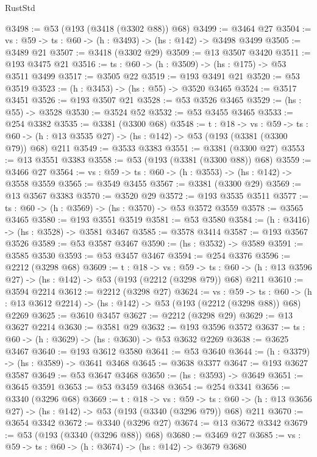 \begin{lexlean}{RustStd}
\begin{coremodule}
@3498 := @53 (@193 (@3418 (@3302 @88)) @68)
@3499 := @3464 @27
@3504 := {vs : @59} -> {ts : @60} -> (h : @3493) -> (hs : @142) -> @3498 @3499
@3505 := @3489 @21
@3507 := @3418 (@3302 @29)
@3509 := @13 @3507 @3420
@3511 := @193 @3475 @21
@3516 := {ts : @60} -> (h : @3509) -> (hs : @175) -> @53 @3511 @3499
@3517 := @3505 @22
@3519 := @193 @3491 @21
@3520 := @53 @3519
@3523 := (h : @3453) -> (hs : @55) -> @3520 @3465
@3524 := @3517 @3451
@3526 := @193 @3507 @21
@3528 := @53 @3526 @3465
@3529 := (hs : @55) -> @3528
@3530 := @3524 @52
@3532 := @53 @3455 @3465
@3533 := @254 @3382
@3535 := @3381 (@3300 @68)
@3548 := {t : @18} ->
  {vs : @59} ->
  {ts : @60} -> (h : @13 @3535 @27) -> (hs : @142) -> @53 (@193 (@3381 (@3300 @79)) @68) @211
@3549 := @3533 @3383
@3551 := @3381 (@3300 @27)
@3553 := @13 @3551 @3383
@3558 := @53 (@193 (@3381 (@3300 @88)) @68)
@3559 := @3466 @27
@3564 := {vs : @59} -> {ts : @60} -> (h : @3553) -> (hs : @142) -> @3558 @3559
@3565 := @3549 @3455
@3567 := @3381 (@3300 @29)
@3569 := @13 @3567 @3383
@3570 := @3520 @29
@3572 := @193 @3535 @3511
@3577 := {ts : @60} -> (h : @3569) -> (hs : @3570) -> @53 @3572 @3559
@3578 := @3565 @3465
@3580 := @193 @3551 @3519
@3581 := @53 @3580
@3584 := (h : @3416) -> (hs : @3528) -> @3581 @3467
@3585 := @3578 @3414
@3587 := @193 @3567 @3526
@3589 := @53 @3587 @3467
@3590 := (hs : @3532) -> @3589
@3591 := @3585 @3530
@3593 := @53 @3457 @3467
@3594 := @254 @3376
@3596 := @2212 (@3298 @68)
@3609 := {t : @18} ->
  {vs : @59} ->
  {ts : @60} -> (h : @13 @3596 @27) -> (hs : @142) -> @53 (@193 (@2212 (@3298 @79)) @68) @211
@3610 := @3594 @2214
@3612 := @2212 (@3298 @27)
@3624 := {vs : @59} ->
  {ts : @60} -> (h : @13 @3612 @2214) -> (hs : @142) -> @53 (@193 (@2212 (@3298 @88)) @68) @2269
@3625 := @3610 @3457
@3627 := @2212 (@3298 @29)
@3629 := @13 @3627 @2214
@3630 := @3581 @29
@3632 := @193 @3596 @3572
@3637 := {ts : @60} -> (h : @3629) -> (hs : @3630) -> @53 @3632 @2269
@3638 := @3625 @3467
@3640 := @193 @3612 @3580
@3641 := @53 @3640
@3644 := (h : @3379) -> (hs : @3589) -> @3641 @3468
@3645 := @3638 @3377
@3647 := @193 @3627 @3587
@3649 := @53 @3647 @3468
@3650 := (hs : @3593) -> @3649
@3651 := @3645 @3591
@3653 := @53 @3459 @3468
@3654 := @254 @3341
@3656 := @3340 (@3296 @68)
@3669 := {t : @18} ->
  {vs : @59} ->
  {ts : @60} -> (h : @13 @3656 @27) -> (hs : @142) -> @53 (@193 (@3340 (@3296 @79)) @68) @211
@3670 := @3654 @3342
@3672 := @3340 (@3296 @27)
@3674 := @13 @3672 @3342
@3679 := @53 (@193 (@3340 (@3296 @88)) @68)
@3680 := @3469 @27
@3685 := {vs : @59} -> {ts : @60} -> (h : @3674) -> (hs : @142) -> @3679 @3680

\end{coremodule}
\end{lexlean}
